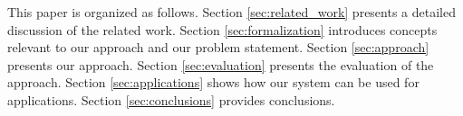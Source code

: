 

This paper is organized as follows.
Section \ref{sec:related_work} presents a detailed discussion of the related work. Section \ref{sec:formalization} introduces concepts relevant to our approach and our problem statement.  Section \ref{sec:approach} presents our approach. Section \ref{sec:evaluation} presents the evaluation of the approach. Section \ref{sec:applications} shows how our system can be used for applications.  Section \ref{sec:conclusions} provides conclusions.



